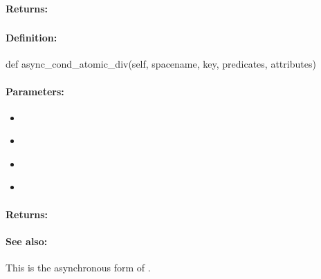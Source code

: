 \paragraph{Returns:}


\pagebreak
\subsubsection{}
\label{api:python:async_cond_atomic_div}


\paragraph{Definition:}
\begin{pythoncode}
def async_cond_atomic_div(self, spacename, key, predicates, attributes)
\end{pythoncode}

\paragraph{Parameters:}
\begin{itemize}[noitemsep]
\item {}\\

\item {}\\

\item {}\\

\item {}\\

\end{itemize}

\paragraph{Returns:}


\paragraph{See also:}  This is the asynchronous form of .

